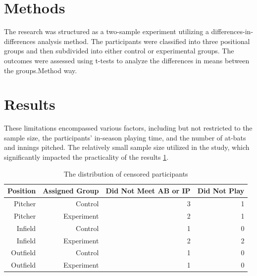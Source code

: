 \documentclass[12pt]{article}
\begin{document}
\section{Methods}
\label{sec:meth}
The research was structured as a two-sample experiment utilizing a differences-in-differences analysis method.
The participants were classified into three positional groups and then subdivided into either control or experimental groups. 
The outcomes were assessed using t-tests to analyze the differences in means between the groups.Method way\cite*{Dalmass2018baseball}.




\section{Results}
\label{sec:resu}
These limitations encompassed various factors, including but not restricted to the sample size, the participants' in-season playing time,
and the number of at-bats and innings pitched. The relatively small sample size utilized in the study, which significantly impacted the practicality of the results \ref{tab:rv}.

\begin{table}[tbp]
  \caption{The distribution of censored participants}
  \label{tab:rv}
\centering
\begin{tabular}{rrrr}
  \toprule
  Position & Assigned Group & Did Not Meet AB or IP & Did Not Play\\ 
  \midrule
Pitcher & Control & 3 & 1\\
Pitcher & Experiment & 2 & 1\\
Infield & Control & 1 & 0 \\
Infield & Experiment & 2 & 2\\
Outfield & Control & 1 & 0\\
Outfield & Experiment & 1 & 0\\
  \bottomrule
\end{tabular}
\end{table}
\end{document}
